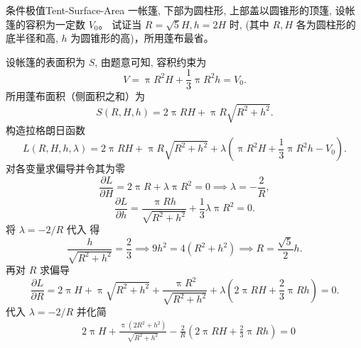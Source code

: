 \begin{problem}{条件极值}{Tent-Surface-Area}
    一帐篷, 下部为圆柱形, 上部盖以圆锥形的顶篷, 设帐篷的容积为一定数 $V_0$。
    试证当 $R = \sqrt{5}H, h = 2H$ 时, (其中 $R, H$ 各为圆柱形的底半径和高, $h$ 为圆锥形的高)，所用蓬布最省。
\end{problem}

\begin{myproof}
    设帐篷的表面积为 $S$, 由题意可知, 容积约束为
    \begin{equation}\label{eq:volume-const-1}
        V = \uppi R^2 H + \frac{1}{3} \uppi R^2 h = V_0 .
    \end{equation}
    所用蓬布面积（侧面积之和）为
    \begin{equation}\label{eq:surface-area-1}
        S(R, H, h) = 2 \uppi R H + \uppi R \sqrt{R^2 + h^2} .
    \end{equation}
    构造拉格朗日函数
    \begin{equation}
        L(R, H, h, \lambda) = 2 \uppi R H + \uppi R \sqrt{R^2 + h^2} + \lambda \left( \uppi R^2 H + \frac{1}{3} \uppi R^2 h - V_0 \right) .
    \end{equation}
    对各变量求偏导并令其为零
    \begin{equation}\label{eq:partial-H}
        \frac{\partial L}{\partial H} = 2 \uppi R + \lambda \uppi R^2 = 0 \implies \lambda = -\frac{2}{R} ,
    \end{equation}
    \begin{equation}\label{eq:partial-h}
        \frac{\partial L}{\partial h} = \frac{\uppi R h}{\sqrt{R^2 + h^2}} + \frac{1}{3} \lambda \uppi R^2 = 0 .
    \end{equation}
    将 $\lambda = -2/R$ 代入  得
    \begin{equation}
        \frac{h}{\sqrt{R^2 + h^2}} = \frac{2}{3} \implies 9h^2 = 4(R^2 + h^2) \implies R = \frac{\sqrt{5}}{2}h .
    \end{equation}
    再对 $R$ 求偏导
    \begin{equation}
        \frac{\partial L}{\partial R} = 2 \uppi H + \uppi \sqrt{R^2 + h^2} + \frac{\uppi R^2}{\sqrt{R^2 + h^2}} + \lambda \left( 2 \uppi R H + \frac{2}{3} \uppi R h \right) = 0 .
    \end{equation}
    代入 $\lambda = -2/R$ 并化简
    \begin{equation}
        \begin{aligned}
                     & 2 \uppi H + \frac{\uppi (2R^2 + h^2)}{\sqrt{R^2 + h^2}} - \frac{2}{R} \left( 2 \uppi R H + \frac{2}{3} \uppi R h \right) = 0 \\

\end{aligned}
\end{equation}
\end{myproof}
